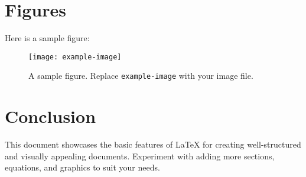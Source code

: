 \documentclass{article}
\begin{document}
\section{Figures}
Here is a sample figure:
\begin{figure}[h!]
\centering
\texttt{[image: example-image]}
\caption{A sample figure. Replace \texttt{example-image} with your image file.}
\label{fig:sample_figure}
\end{figure}

\section{Conclusion}
This document showcases the basic features of \LaTeX{} for creating well-structured and visually appealing documents. Experiment with adding more sections, equations, and graphics to suit your needs.
\end{document}
